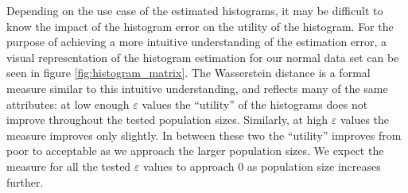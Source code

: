 \documentclass[12pt]{article}
\renewcommand{\epsilon}{\varepsilon}
\begin{document}
\begin{description}
    Depending on the use case of the estimated histograms, it may be difficult to know the impact of the histogram error on the utility of the histogram. For the purpose of achieving a more intuitive understanding of the estimation error, a visual representation of the histogram estimation for our normal data set can be seen in figure \ref{fig:histogram_matrix}. The Wasserstein distance is a formal measure similar to this intuitive understanding, and reflects many of the same attributes: at low enough $\epsilon$ values the ``utility'' of the histograms does not improve throughout the tested population sizes. Similarly, at high $\epsilon$ values the measure improves only slightly. In between these two the ``utility'' improves from poor to acceptable as we approach the larger population sizes. We expect the measure for all the tested $\epsilon$ values to approach 0 as population size increases further.
    

\end{description}
\end{document}
